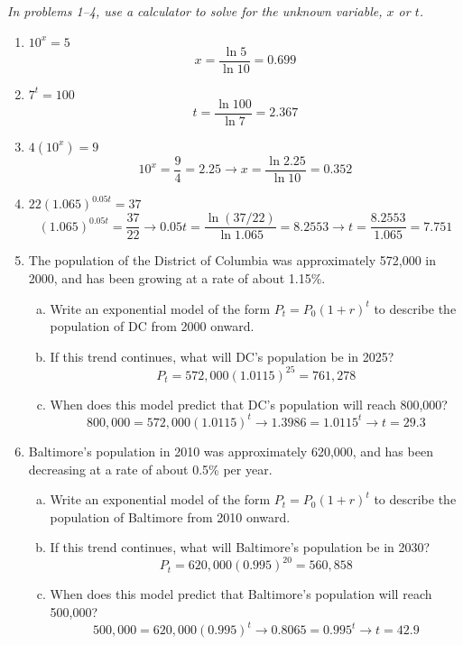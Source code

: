 \emph{In problems 1--4, use a calculator to solve for the unknown variable, $x$ or $t$.}
\begin{enumerate}
\item $10^x=5$ 
\[x = \dfrac{\ln 5}{\ln 10} = 0.699\]

\item $7^t=100$ 
\[t = \dfrac{\ln 100}{\ln 7} = 2.367\]

\item $4(10^x)=9$ 
\[10^x = \dfrac{9}{4} = 2.25 \longrightarrow x = \dfrac{\ln 2.25}{\ln 10} = 0.352\]

\item $22(1.065)^{0.05t}=37$ 
\[(1.065)^{0.05t} = \dfrac{37}{22} \longrightarrow 0.05t = \dfrac{\ln (37/22)}{\ln 1.065} = 8.2553 \longrightarrow t = \dfrac{8.2553}{1.065} = 7.751\]

\item The population of the District of Columbia was approximately 572,000 in 2000, and has been growing at a rate of about 1.15\%.
\begin{enumerate}[(a)]
\item Write an exponential model of the form $P_t = P_0(1 + r)^t$ to describe the population of DC from 2000 onward. 
\item If this trend continues, what will DC's population be in 2025? 
\[P_t = 572,000(1.0115)^{25} = 761,278\]
\item When does this model predict that DC's population will reach 800,000? 
\[800,000 = 572,000(1.0115)^t \longrightarrow 1.3986 = 1.0115^t \longrightarrow t = 29.3\]
\end{enumerate}

\item Baltimore's population in 2010 was approximately 620,000, and has been decreasing at a rate of about 0.5\% per year.
\begin{enumerate}[(a)]
\item Write an exponential model of the form $P_t = P_0(1 + r)^t$ to describe the population of Baltimore from 2010 onward. 
\item If this trend continues, what will Baltimore's population be in 2030? 
\[P_t = 620,000(0.995)^{20} = 560,858\]
\item When does this model predict that Baltimore's population will reach 500,000? 
\[500,000 = 620,000(0.995)^t \longrightarrow 0.8065 = 0.995^t \longrightarrow t = 42.9\]
\end{enumerate}


\end{enumerate}
